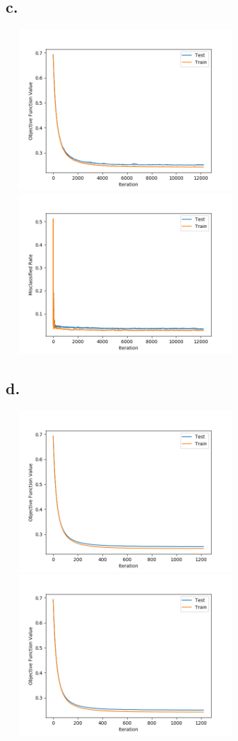 \documentclass{article}
\begin{document}
\subsection*{c.}
\includegraphics[width=9cm, height=6cm]{A6_c_1.png}
\includegraphics[width=9cm, height=6cm]{A6_c_2.png}

\subsection*{d.}
\includegraphics[width=9cm, height=6cm]{A6_d_1.png}
\includegraphics[width=9cm, height=6cm]{A6_d_1.png}
\end{document}
